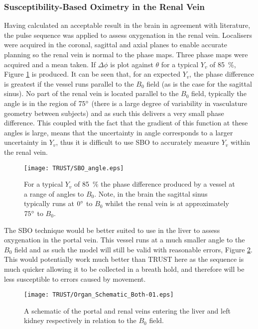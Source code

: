 \subsubsection{Susceptibility-Based Oximetry in the Renal Vein}
Having calculated an acceptable result in the brain in agreement with literature, the pulse sequence was applied to assess oxygenation in the renal vein. Localisers were acquired in the coronal, sagittal and axial planes to enable accurate planning so the renal vein is normal to the phase maps. Three phase maps were acquired and a mean taken. If $\Delta \phi$ is plot against $\theta$ for a typical $Y_v$ of 85~\%, Figure \ref{fig:SBO_kidney} is produced. It can be seen that, for an expected $Y_v$, the phase difference is greatest if the vessel runs parallel to the $B_0$ field (as is the case for the sagittal sinus). No part of the renal vein is located parallel to the $B_0$ field, typically the angle is in the region of $75\degree$ (there is a large degree of variability in vasculature geometry between subjects) and as such this delivers a very small phase difference. This coupled with the fact that the gradient of this function at these angles is large, means that the uncertainty in angle corresponds to a larger uncertainty in $Y_v$, thus it is difficult to use \ac{SBO} to accurately measure $Y_v$ within the renal vein.

\begin{figure}[H]
	\centering
	\texttt{[image: TRUST/SBO\_angle.eps]}
	\caption{For a typical $Y_v$ of 85~\% the phase difference produced by a vessel at a range of angles to $B_0$. Note, in the brain the sagittal sinus typically runs at $0\degree$ to $B_0$ whilst the renal vein is at approximately $75\degree$ to $B_0$.}
	\label{fig:SBO_kidney}	
\end{figure}
The \ac{SBO} technique would be better suited to use in the liver to assess oxygenation in the portal vein. This vessel runs at a much smaller angle to the $B_0$ field and as such the model will still be valid with reasonable errors, Figure \ref{fig:PV}. This would potentially work much better than \ac{TRUST} here as the sequence is much quicker allowing it to be collected in a breath hold, and therefore will be less susceptible to errors caused by movement.

\begin{figure}[H]
	\centering
	\texttt{[image: TRUST/Organ\_Schematic\_Both-01.eps]}
	\caption{A schematic of the portal and renal veins entering the liver and left kidney respectively in relation to the $B_0$ field.}
	\label{fig:PV}	
\end{figure}

